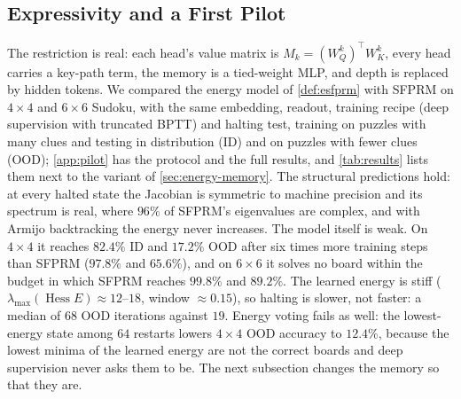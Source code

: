 \begin{table}[t]
  \caption{Energy SFPRM against SFPRM on $4\times4$ and $6\times6$ Sudoku ($500$ test puzzles per set;
  board accuracy in \%, OOD unless stated; protocol in \cref{app:pilot}). ``Energy'': the model of
  \cref{def:esfprm} (\cref{sec:energy-pilot}). ``Codebook'': the variant of
  \cref{sec:energy-memory} with answer codebook, tied readout and embedding and the $\beta$ schedule
  ($\rho=8$, $K=8$); ``$+$rank'' adds the ranking loss ($m=1$, $R=2$). ``Mem.\ MLP'': SFPRM with only
  its MLP replaced by the tied memory $\Xi^\top\operatorname{softmax}(\beta\Xi h)$, no energy. Energy
  models halt with Armijo backtracking, SFPRM models with the patience rule. Iterations to halt over
  halted puzzles; spectrum of $\mathrm dF$ at polished halted states; $B{=}64$: accuracy of the
  restart chosen by each rule among $64$; committed: boards whose tokens are all committed
  ($\epsilon=0.1$) at the halted state.}
  \label{tab:results}
  \vskip 0.1in
  \begin{center}
  \begin{footnotesize}
  \setlength{\tabcolsep}{3pt}
  
  \end{footnotesize}
  \end{center}
  \vskip -0.1in
\end{table}

\subsection{Expressivity and a First Pilot}
\label{sec:energy-pilot}

The restriction is real: each head's value matrix is $M_k=(W_Q^k)^\top W_K^k$, every head carries a
key-path term, the memory is a tied-weight MLP, and depth is replaced by hidden tokens. We compared
the energy model of \cref{def:esfprm} with SFPRM on $4\times4$ and $6\times6$ Sudoku, with the same
embedding, readout, training recipe (deep supervision with truncated BPTT) and halting test,
training on puzzles with many clues and testing in distribution (ID) and on puzzles with fewer clues
(OOD); \cref{app:pilot} has the protocol and the full results, and \cref{tab:results} lists them
next to the variant of \cref{sec:energy-memory}. The structural predictions hold: at every halted
state the Jacobian is symmetric to machine precision and its spectrum is real, where $96\%$ of
SFPRM's eigenvalues are complex, and with Armijo backtracking the energy never increases. The model
itself is weak. On $4\times4$ it reaches $82.4\%$ ID and $17.2\%$ OOD after six times more training
steps than SFPRM ($97.8\%$ and $65.6\%$), and on $6\times6$ it solves no board within the budget in
which SFPRM reaches $99.8\%$ and $89.2\%$. The learned energy is stiff
($\lambda_{\max}(\operatorname{Hess}E)\approx12$--$18$, window $\approx0.15$), so halting is slower,
not faster: a median of $68$ OOD iterations against $19$. Energy voting fails as well: the
lowest-energy state among $64$ restarts lowers $4\times4$ OOD accuracy to $12.4\%$, because the
lowest minima of the learned energy are not the correct boards and deep supervision never asks them
to be. The next subsection changes the memory so that they are.


